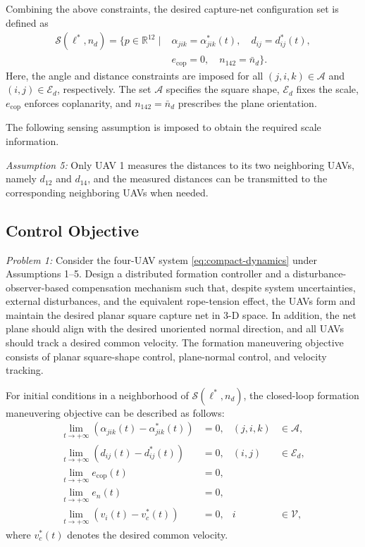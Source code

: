 \documentclass[lettersize,journal]{IEEEtran}
\begin{document}
Combining the above constraints, the desired capture-net configuration set is defined as
\begin{equation}
\label{eq:desired-formation-set}
\begin{aligned}
\mathcal S(\ell^*,n_d)=\{p\in\mathbb R^{12}\mid{}&
\alpha_{jik}=\alpha_{jik}^*(t),\quad d_{ij}=d_{ij}^*(t),\\
&
e_{\mathrm{cop}}=0,\quad n_{142}=\bar n_d\}.
\end{aligned}
\end{equation}
Here, the angle and distance constraints are imposed for all \((j,i,k)\in\mathcal A\) and \((i,j)\in\mathcal E_d\), respectively. The set \(\mathcal A\) specifies the square shape, \(\mathcal E_d\) fixes the scale, \(e_{\mathrm{cop}}\) enforces coplanarity, and \(n_{142}=\bar n_d\) prescribes the plane orientation.

The following sensing assumption is imposed to obtain the required scale information.

\emph{Assumption 5:} Only UAV 1 measures the distances to its two neighboring UAVs, namely \(d_{12}\) and \(d_{14}\), and the measured distances can be transmitted to the corresponding neighboring UAVs when needed.

\subsection{Control Objective}

\emph{Problem 1:} Consider the four-UAV system \eqref{eq:compact-dynamics} under Assumptions 1--5. Design a distributed formation controller and a disturbance-observer-based compensation mechanism such that, despite system uncertainties, external disturbances, and the equivalent rope-tension effect, the UAVs form and maintain the desired planar square capture net in 3-D space. In addition, the net plane should align with the desired unoriented normal direction, and all UAVs should track a desired common velocity. The formation maneuvering objective consists of planar square-shape control, plane-normal control, and velocity tracking.

For initial conditions in a neighborhood of \(\mathcal S(\ell^*,n_d)\), the closed-loop formation maneuvering objective can be described as follows:
\begin{align}
\lim_{t\to+\infty}
\left(\alpha_{jik}(t)-\alpha_{jik}^*(t)\right)&=0,
& (j,i,k)&\in\mathcal A, \label{eq:angle-convergence}\\
\lim_{t\to+\infty}
\left(d_{ij}(t)-d_{ij}^*(t)\right)&=0,
& (i,j)&\in\mathcal E_d, \label{eq:distance-convergence}\\
\lim_{t\to+\infty}e_{\mathrm{cop}}(t)&=0, \label{eq:coplanar-convergence}\\
\lim_{t\to+\infty}e_n(t)&=0, \label{eq:normal-convergence}\\
\lim_{t\to+\infty}
\left(v_i(t)-v_c^*(t)\right)&=0,
& i&\in\mathcal V, \label{eq:velocity-convergence}
\end{align}
where \(v_c^*(t)\) denotes the desired common velocity.
\end{document}
